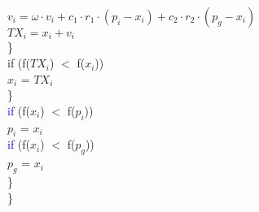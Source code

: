 \documentclass{article}
\begin{document}
{\indent\indent\indent\indent				$v_i = \omega \cdot v_i + c_1 \cdot r_1 \cdot (p_i - x_i) + c_2 \cdot r_2 \cdot (p_g - x_i)$\\
\indent\indent\indent\indent				$TX_i = x_i + v_i$\\
\indent\indent\indent			\}\\
\indent\indent\indent			if (f($TX_i$) $<$ f($x_i$))\\
\indent\indent\indent\indent				$x_i$ = $TX_i$\\
\indent\indent	\}\\
\indent\indent		\textcolor{blue}{if} (f($x_i$) $<$ f($p_i$))\\
\indent\indent\indent			$p_i$ = $x_i$\\
\indent\indent		\textcolor{blue}{if} (f($x_i$) $<$ f($p_g$))\\
\indent\indent\indent			$p_g$ = $x_i$\\
\indent	\}\\
\}
}


\end{document}
